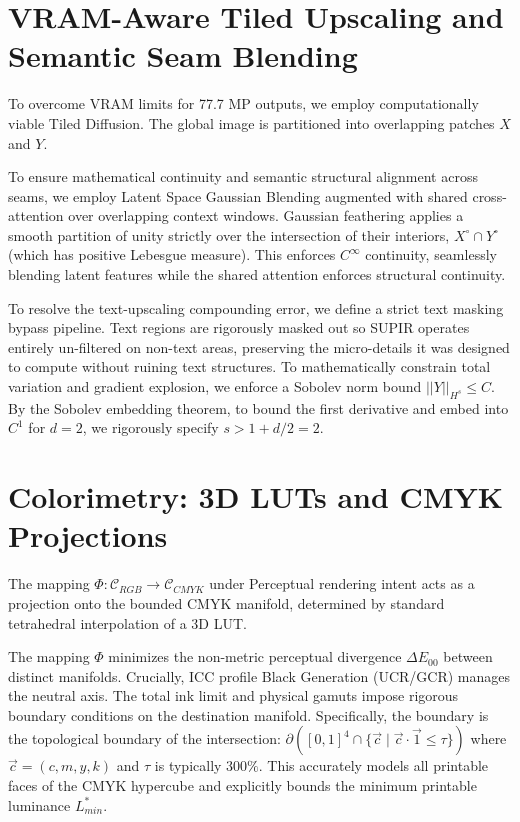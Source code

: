 \documentclass[10pt,journal,compsoc]{IEEEtran}
\begin{document}
\section{VRAM-Aware Tiled Upscaling and Semantic Seam Blending}
To overcome VRAM limits for 77.7 MP outputs, we employ computationally viable Tiled Diffusion. The global image is partitioned into overlapping patches $X$ and $Y$. 

\begin{definition}
To ensure mathematical continuity and semantic structural alignment across seams, we employ Latent Space Gaussian Blending augmented with shared cross-attention over overlapping context windows. Gaussian feathering applies a smooth partition of unity strictly over the intersection of their interiors, $X^\circ \cap Y^\circ$ (which has positive Lebesgue measure). This enforces $C^\infty$ continuity, seamlessly blending latent features while the shared attention enforces structural continuity.
\end{definition}

To resolve the text-upscaling compounding error, we define a strict text masking bypass pipeline. Text regions are rigorously masked out so SUPIR operates entirely un-filtered on non-text areas, preserving the micro-details it was designed to compute without ruining text structures. To mathematically constrain total variation and gradient explosion, we enforce a Sobolev norm bound $||Y||_{H^s} \le C$. By the Sobolev embedding theorem, to bound the first derivative and embed into $C^1$ for $d=2$, we rigorously specify $s > 1 + d/2 = 2$.

\section{Colorimetry: 3D LUTs and CMYK Projections}
\begin{lemma}
The mapping $\Phi: \mathcal{C}_{RGB} \to \mathcal{C}_{CMYK}$ under Perceptual rendering intent acts as a projection onto the bounded CMYK manifold, determined by standard tetrahedral interpolation of a 3D LUT.
\end{lemma}

The mapping $\Phi$ minimizes the non-metric perceptual divergence $\Delta E_{00}$ between distinct manifolds. Crucially, ICC profile Black Generation (UCR/GCR) manages the neutral axis. The total ink limit and physical gamuts impose rigorous boundary conditions on the destination manifold. Specifically, the boundary is the topological boundary of the intersection:
$ \partial \left( [0,1]^4 \cap \{ \vec{c} \mid \vec{c} \cdot \vec{1} \le \tau \} \right) $
where $\vec{c} = (c,m,y,k)$ and $\tau$ is typically $300\%$. This accurately models all printable faces of the CMYK hypercube and explicitly bounds the minimum printable luminance $L^*_{min}$.
\end{document}
